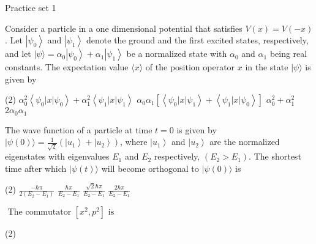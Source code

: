\newpage 
\begin{abox}
	Practice set 1
	\end{abox}
\begin{enumerate}
	\begin{minipage}{\textwidth}
	\item Consider a particle in a one dimensional potential that satisfies $V(x)=V(-x)$. Let $\left|\psi_{0}\right\rangle$ and $\left|\psi_{1}\right\rangle$ denote the ground and the first excited states, respectively, and let $|\psi\rangle=\alpha_{0}\left|\psi_{0}\right\rangle+\alpha_{1}\left|\psi_{1}\right\rangle$ be a normalized state with $\alpha_{0}$ and $\alpha_{1}$ being real constants. The expectation value $\langle x\rangle$ of the position operator $x$ in the state $|\psi\rangle$ is given by
\end{minipage}
\begin{tasks}(2)
	\task[\textbf{A.}] $\alpha_{0}^{2}\left\langle\psi_{0}|x| \psi_{0}\right\rangle+\alpha_{1}^{2}\left\langle\psi_{1}|x| \psi_{1}\right\rangle$
	\task[\textbf{B.}]$\alpha_{0} \alpha_{1}\left[\left\langle\psi_{0}|x| \psi_{1}\right\rangle+\left\langle\psi_{1}|x| \psi_{0}\right\rangle\right]$
	\task[\textbf{C.}]$\alpha_{0}^{2}+\alpha_{1}^{2}$
	\task[\textbf{D.}]$2 \alpha_{0} \alpha_{1}$
\end{tasks}
\begin{minipage}{\textwidth}
	\item The wave function of a particle at time $t=0$ is given by $|\psi(0)\rangle=\frac{1}{\sqrt{2}}\left(\left|u_{1}\right\rangle+\left|u_{2}\right\rangle\right)$, where
	$\left|u_{1}\right\rangle$ and $\left|u_{2}\right\rangle$ are the normalized eigenstates with eigenvalues $E_{1}$ and $E_{2}$ respectively, $\left(E_{2}>E_{1}\right)$. The shortest time after which $|\psi(t)\rangle$ will become orthogonal to $|\psi(0)\rangle$ is
\end{minipage}
\begin{tasks}(2)
	\task[\textbf{A.}] $\frac{-\hbar \pi}{2\left(E_{2}-E_{1}\right)}$
	\task[\textbf{B.}]$\frac{\hbar \pi}{E_{2}-E_{1}}$
	\task[\textbf{C.}]$\frac{\sqrt{2} \hbar \pi}{E_{2}-E_{1}}$
	\task[\textbf{D.}]$\frac{2 \hbar \pi}{E_{2}-E_{1}}$
\end{tasks}
\begin{minipage}{\textwidth}
	\item $\text { The commutator }\left[x^{2}, p^{2}\right] \text { is }$
\end{minipage}
\begin{tasks}(2)

\end{tasks}
\end{enumerate}
